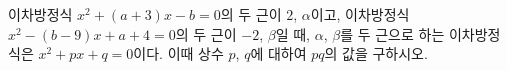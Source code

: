 이차방정식 $x^2+(a+3)x-b=0$의 두 근이 $2$, $\alpha$이고, 이차방정식 $x^2-(b-9)x+a+4=0$의 두 근이 $-2$, $\beta$일 때, $\alpha$, $\beta$를 두 근으로 하는 이차방정식은 $x^2+px+q=0$이다. 이때 상수 $p$, $q$에 대하여 $pq$의 값을 구하시오. 
